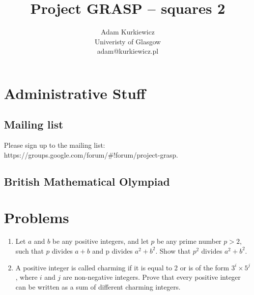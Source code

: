 \documentclass{article}
\title{Project GRASP -- squares 2}
\author{Adam Kurkiewicz\\
  \small{Univeristy of Glasgow}\\
  \small{adam@kurkiewicz.pl}}
\begin{document}
  \maketitle
  \section{Administrative Stuff}
  
  \subsection{Mailing list}
  Please sign up to the mailing list: https://groups.google.com/forum/\#!forum/project-grasp.
  \subsection{British Mathematical Olympiad}

  \section{Problems}
  
  \begin{enumerate}
    \item Let $a$ and $b$ be any positive integers, and let $p$ be any prime number $p > 2$, such that $p$ divides $a + b$ and p divides $a^{2} + b^{2}$. Show that $p^{2}$ divides $a^{2} + b^{2}$.
    \item A positive integer is called charming if it is equal to 2 or is of the form $3^{i}×5^{j}$, where $i$ and $j$ are non-negative integers. Prove that every positive integer can be written as a sum of different charming integers.
  \end{enumerate}
\end{document}
